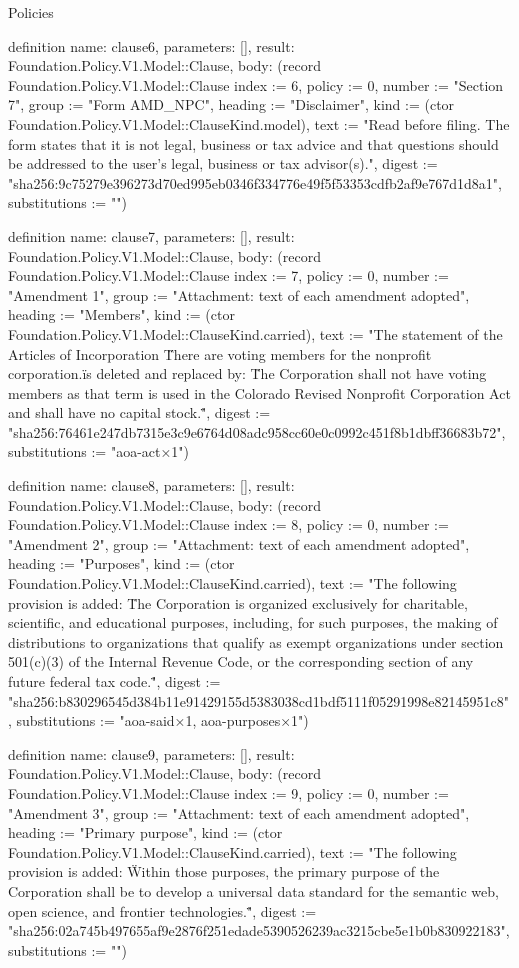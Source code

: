 \begin{lexlean}{Policies}
\begin{semanticmodule}
definition{
  name: clause6,
  parameters: [],
  result: Foundation.Policy.V1.Model::Clause,
  body: (record Foundation.Policy.V1.Model::Clause {index := 6, policy := 0, number := "Section 7", group := "Form AMD_NPC", heading := "Disclaimer", kind := (ctor Foundation.Policy.V1.Model::ClauseKind.model), text := "Read before filing. The form states that it is not legal, business or tax advice and that questions should be addressed to the user's legal, business or tax advisor(s).", digest := "sha256:9c75279e396273d70ed995eb0346f334776e49f5f53353cdfb2af9e767d1d8a1", substitutions := ""})
}

definition{
  name: clause7,
  parameters: [],
  result: Foundation.Policy.V1.Model::Clause,
  body: (record Foundation.Policy.V1.Model::Clause {index := 7, policy := 0, number := "Amendment 1", group := "Attachment: text of each amendment adopted", heading := "Members", kind := (ctor Foundation.Policy.V1.Model::ClauseKind.carried), text := "The statement of the Articles of Incorporation \"There are voting members for the nonprofit corporation.\" is deleted and replaced by: \"The Corporation shall not have voting members as that term is used in the Colorado Revised Nonprofit Corporation Act and shall have no capital stock.\"", digest := "sha256:76461e247db7315e3c9e6764d08adc958cc60e0c0992c451f8b1dbff36683b72", substitutions := "aoa-act×1"})
}

definition{
  name: clause8,
  parameters: [],
  result: Foundation.Policy.V1.Model::Clause,
  body: (record Foundation.Policy.V1.Model::Clause {index := 8, policy := 0, number := "Amendment 2", group := "Attachment: text of each amendment adopted", heading := "Purposes", kind := (ctor Foundation.Policy.V1.Model::ClauseKind.carried), text := "The following provision is added: \"The Corporation is organized exclusively for charitable, scientific, and educational purposes, including, for such purposes, the making of distributions to organizations that qualify as exempt organizations under section 501(c)(3) of the Internal Revenue Code, or the corresponding section of any future federal tax code.\"", digest := "sha256:b830296545d384b11e91429155d5383038cd1bdf5111f05291998e82145951c8", substitutions := "aoa-said×1, aoa-purposes×1"})
}

definition{
  name: clause9,
  parameters: [],
  result: Foundation.Policy.V1.Model::Clause,
  body: (record Foundation.Policy.V1.Model::Clause {index := 9, policy := 0, number := "Amendment 3", group := "Attachment: text of each amendment adopted", heading := "Primary purpose", kind := (ctor Foundation.Policy.V1.Model::ClauseKind.carried), text := "The following provision is added: \"Within those purposes, the primary purpose of the Corporation shall be to develop a universal data standard for the semantic web, open science, and frontier technologies.\"", digest := "sha256:02a745b497655af9e2876f251edade5390526239ac3215cbe5e1b0b830922183", substitutions := ""})
}


\end{semanticmodule}
\end{lexlean}
